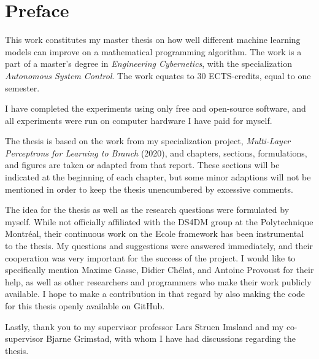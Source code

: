\chapter*{Preface}
%
This work constitutes my master thesis on how well different machine learning models can improve on a mathematical programming algorithm. The work is a part of a master's degree in \textit{Engineering Cybernetics}, with the specialization\textit{ Autonomous System Control}.
The work equates to 30 ECTS-credits, equal to one semester. 

I have completed the experiments using only free and open-source software, and all experiments were run on computer hardware I have paid for myself.  

The thesis is based on the work from my specialization project, \textit{Multi-Layer Perceptrons for Learning to Branch
} (2020), and chapters, sections, formulations, and figures are taken or adapted from that report. These sections will be indicated at the beginning of each chapter, but some minor adaptions will not be mentioned in order to keep the thesis unencumbered by excessive comments.

The idea for the thesis as well as the research questions were formulated by myself.
While not officially affiliated with the \gls{DS4DM} group at the Polytechnique Montr\'{e}al, their continuous work on the \gls{Ecole} framework has been instrumental to the thesis. My questions and suggestions were answered immediately, and their cooperation was very important for the success of the project. I would like to specifically mention Maxime Gasse, Didier Ch\'{e}lat, and Antoine Provoust for their help, as well as other researchers and programmers who make their work publicly available. I hope to make a contribution in that regard by also making the code for this thesis openly available on GitHub.

Lastly, thank you to my supervisor professor Lars Struen Imsland and my co-supervisor Bjarne Grimstad, with whom I have had discussions regarding the thesis. 


%
\clearpage
